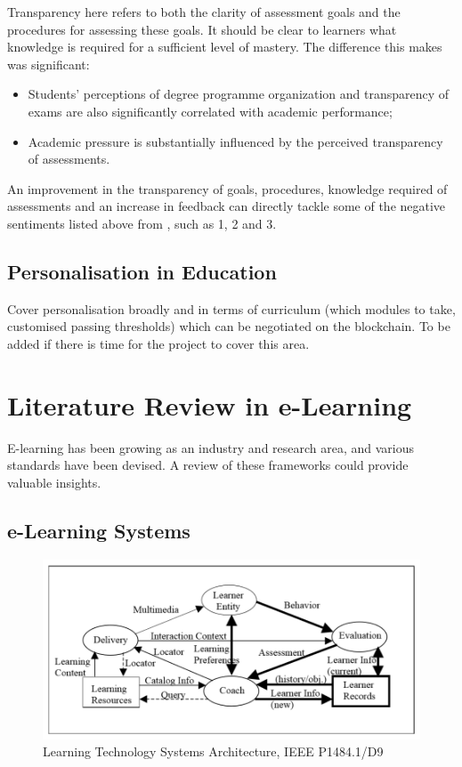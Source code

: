 Transparency here refers to both the clarity of assessment goals and the procedures for assessing these goals. 
It should be clear to learners what knowledge is required for a sufficient level of mastery. \citep{suhre2013determinants}
The difference this makes was significant:

\begin{itemize}
  \item Students' perceptions of degree programme organization and transparency of exams are also 
  significantly correlated with academic performance;
  \item Academic pressure is substantially influenced by the perceived transparency of assessments.
\end{itemize}

An improvement in the transparency of goals, procedures, knowledge required of assessments and an increase 
in feedback can directly tackle some of the negative sentiments listed above from \citet{brown1999assessment}, 
such as 1, 2 and 3.

\subsection{Personalisation in Education}

Cover personalisation broadly and in terms of curriculum (which modules to take, 
customised passing thresholds) which can be negotiated on the blockchain.
To be added if there is time for the project to cover this area.

\section{Literature Review in e-Learning}

E-learning has been growing as an industry and research area, and various standards have been devised. 
A review of these frameworks could provide valuable insights.

\subsection{e-Learning Systems}

\begin{figure}[!ht] 
    \centering    
    \includegraphics[width=1.0\textwidth]{LTSA}
    \caption[Learning Technology Systems Architecture]
        {Learning Technology Systems Architecture, IEEE P1484.1/D9 \citep{farance1999learning}}
    \label{fig:LTSA}
\end{figure}

